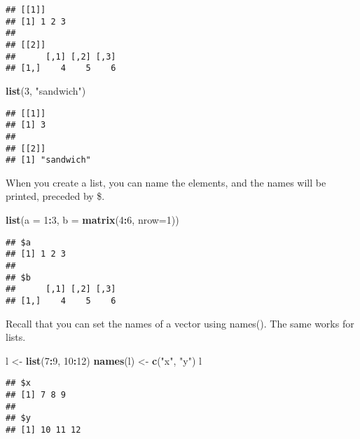 \documentclass[
]{article}
\newenvironment{Shaded}{\begin{snugshade}}{\end{snugshade}}
\newcommand{\DataTypeTok}[1]{\textcolor[rgb]{0.13,0.29,0.53}{#1}}
\newcommand{\DecValTok}[1]{\textcolor[rgb]{0.00,0.00,0.81}{#1}}
\newcommand{\KeywordTok}[1]{\textcolor[rgb]{0.13,0.29,0.53}{\textbf{#1}}}
\newcommand{\NormalTok}[1]{#1}
\newcommand{\OperatorTok}[1]{\textcolor[rgb]{0.81,0.36,0.00}{\textbf{#1}}}
\newcommand{\StringTok}[1]{\textcolor[rgb]{0.31,0.60,0.02}{#1}}
\begin{document}
\begin{verbatim}
## [[1]]
## [1] 1 2 3
## 
## [[2]]
##      [,1] [,2] [,3]
## [1,]    4    5    6
\end{verbatim}

\begin{Shaded}
\begin{Highlighting}[]
\KeywordTok{list}\NormalTok{(}\DecValTok{3}\NormalTok{, }\StringTok{"sandwich"}\NormalTok{)}
\end{Highlighting}
\end{Shaded}

\begin{verbatim}
## [[1]]
## [1] 3
## 
## [[2]]
## [1] "sandwich"
\end{verbatim}

When you create a list, you can name the elements, and the names will be
printed, preceded by \$.

\begin{Shaded}
\begin{Highlighting}[]
\KeywordTok{list}\NormalTok{(}\DataTypeTok{a =} \DecValTok{1}\OperatorTok{:}\DecValTok{3}\NormalTok{, }\DataTypeTok{b =} \KeywordTok{matrix}\NormalTok{(}\DecValTok{4}\OperatorTok{:}\DecValTok{6}\NormalTok{, }\DataTypeTok{nrow=}\DecValTok{1}\NormalTok{))}
\end{Highlighting}
\end{Shaded}

\begin{verbatim}
## $a
## [1] 1 2 3
## 
## $b
##      [,1] [,2] [,3]
## [1,]    4    5    6
\end{verbatim}

Recall that you can set the names of a vector using names(). The same
works for lists.

\begin{Shaded}
\begin{Highlighting}[]
\NormalTok{l <-}\StringTok{ }\KeywordTok{list}\NormalTok{(}\DecValTok{7}\OperatorTok{:}\DecValTok{9}\NormalTok{, }\DecValTok{10}\OperatorTok{:}\DecValTok{12}\NormalTok{)}
\KeywordTok{names}\NormalTok{(l) <-}\StringTok{ }\KeywordTok{c}\NormalTok{(}\StringTok{"x"}\NormalTok{, }\StringTok{"y"}\NormalTok{)}
\NormalTok{l}
\end{Highlighting}
\end{Shaded}

\begin{verbatim}
## $x
## [1] 7 8 9
## 
## $y
## [1] 10 11 12
\end{verbatim}
\end{document}
